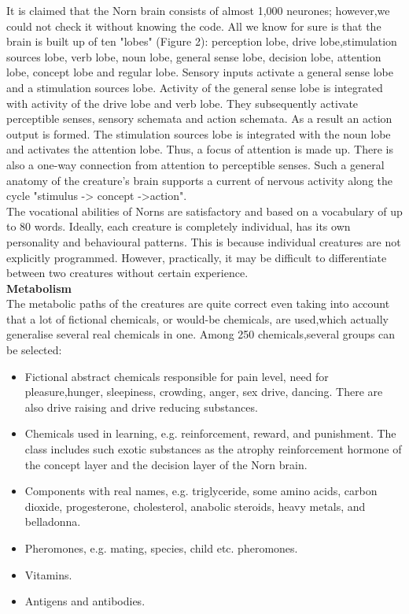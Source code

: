 \documentclass[11pt,twoside,a4paper]{article}
\begin{document}
It is claimed that the Norn brain consists of almost 1,000 neurones; however,we could not check it without knowing the code. All we know for sure is that the brain is built up of ten "lobes" (Figure 2): perception lobe, drive lobe,stimulation sources lobe, verb lobe, noun lobe, general sense lobe, decision lobe, attention lobe, concept lobe and regular lobe. Sensory inputs activate a general sense lobe and a stimulation sources lobe. Activity of the general sense lobe is integrated with activity of the drive lobe and verb lobe. They subsequently activate perceptible senses, sensory schemata and action schemata. As a result an action output is formed. The stimulation sources lobe is integrated with the noun lobe and activates the attention lobe. Thus, a focus of attention is made up. There is also a one-way connection from attention to perceptible senses. Such a general anatomy of the creature's brain supports a current of nervous activity along the cycle "stimulus -> concept ->action".~\\

The vocational abilities of Norns are satisfactory and based on a vocabulary of up to 80 words. Ideally, each creature is completely individual, has its own personality and behavioural patterns. This is because individual creatures are not explicitly programmed. However, practically, it may be difficult to differentiate between two creatures without certain experience.~\\

\textbf{Metabolism}~\\

The metabolic paths of the creatures are quite correct even taking into account that a lot of fictional chemicals, or would-be chemicals, are used,which actually generalise several real chemicals in one. Among 250 chemicals,several groups can be selected:

\begin{itemize}
	\item Fictional abstract chemicals responsible for pain level, need for pleasure,hunger, sleepiness, crowding, anger, sex drive, dancing. There are also drive raising and drive reducing substances.
	\item Chemicals used in learning, e.g. reinforcement, reward, and punishment. The class includes such exotic substances as the atrophy reinforcement hormone of the concept layer and the decision layer of the Norn brain.
	\item Components with real names, e.g. triglyceride, some amino acids, carbon dioxide, progesterone, cholesterol, anabolic steroids, heavy metals, and belladonna.
	\item Pheromones, e.g. mating, species, child etc. pheromones.
	\item Vitamins.
	\item Antigens and antibodies.
\end{itemize}
\end{document}
